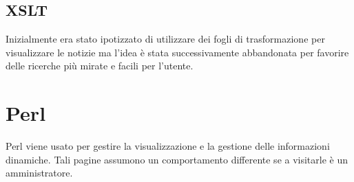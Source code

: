 \documentclass{article}
\begin{document}
	\subsection{XSLT}
		Inizialmente era stato ipotizzato di utilizzare dei fogli di trasformazione per visualizzare le notizie ma l'idea 
		è stata successivamente abbandonata per favorire delle ricerche più mirate e facili per l'utente.

 \newpage

\section{Perl}
	Perl viene usato per gestire la visualizzazione e la gestione delle informazioni dinamiche. 
	Tali pagine assumono un comportamento differente se a visitarle è un amministratore.
\end{document}
